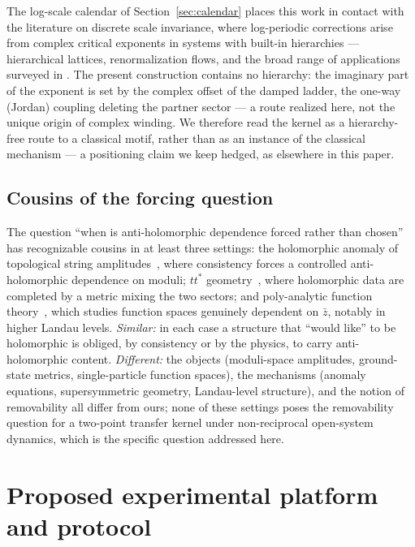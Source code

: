 \documentclass[11pt,a4paper]{article}
\newcommand{\zb}{\bar{z}}
\begin{document}
The log-scale calendar of Section~\ref{sec:calendar} places this work in
contact with the literature on discrete scale invariance, where
log-periodic corrections arise from complex critical exponents
\cite{Derrida1984,Sornette1998} in systems with built-in hierarchies ---
hierarchical lattices, renormalization flows, and the broad range of
applications surveyed in \cite{Sornette1998}. The present construction
contains no hierarchy: the imaginary part of the exponent is set by the
complex offset of the damped ladder, the one-way (Jordan) coupling deleting
the partner sector --- a route realized here, not the unique origin of
complex winding. We therefore read the kernel as a
hierarchy-free route to a classical motif, rather than as an instance of
the classical mechanism --- a positioning claim we keep hedged, as
elsewhere in this paper.

\subsection{Cousins of the forcing question}

The question ``when is anti-holomorphic dependence forced rather than chosen''
has recognizable cousins in at least three settings: the holomorphic anomaly of
topological string amplitudes~\cite{BCOV1994}, where consistency forces a
controlled anti-holomorphic dependence on moduli; $tt^*$
geometry~\cite{CecottiVafa1991}, where holomorphic data are completed by a
metric mixing the two sectors; and poly-analytic function
theory~\cite{Vasilevski2000,Abreu2010,AbreuFeichtinger2014}, which studies
function spaces genuinely dependent on $\zb$, notably in higher Landau levels.
\emph{Similar:} in each case a structure that ``would like'' to be holomorphic
is obliged, by consistency or by the physics, to carry anti-holomorphic
content. \emph{Different:} the objects (moduli-space amplitudes, ground-state
metrics, single-particle function spaces), the mechanisms (anomaly equations,
supersymmetric geometry, Landau-level structure), and the notion of
removability all differ from ours; none of these settings poses the
removability question for a two-point transfer kernel under non-reciprocal
open-system dynamics, which is the specific question addressed here.

\section{Proposed experimental platform and protocol}
\label{sec:platform}
\end{document}
